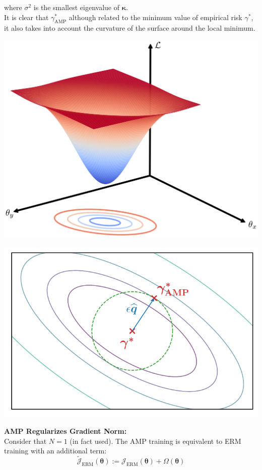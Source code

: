 \documentclass[landscape,a0paper,fontscale=0.3]{baposter}
\begin{document}
\begin{poster}
{\noindent where $\sigma^2$ is the smallest eigenvalue of $\boldsymbol{\kappa}$.\\
It is clear that $\gamma^\ast_\mathrm{AMP}$ although related to the minimum value of empirical risk $\gamma^\ast$, it also takes into account the curvature of the surface around the local minimum.\\
\begin{minipage}{0.99\linewidth}
\centering
\begin{minipage}{0.4\linewidth}
\centering
\includegraphics[width=.8\linewidth]{figs/surface.png}
\end{minipage}
\begin{minipage}{0.4\linewidth}
\centering
\includegraphics[width=.8\linewidth]{figs/gaussian.pdf}
\end{minipage}
\end{minipage}

\textbf{\color{blue}AMP Regularizes Gradient Norm:}\\
Consider that $N\!=\!1$ (in fact used). The AMP training is equivalent to ERM training with an additional term:
\vspace{-0.8em}
\begin{equation*}
\widetilde{\mathcal{J}}_\mathrm{ERM}(\boldsymbol{\theta}):=\mathcal{J}_\mathrm{ERM}(\boldsymbol{\theta})+\Omega(\boldsymbol{\theta})
\end{equation*}
\vspace{-2.3em}

}
\end{poster}
\end{document}
